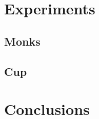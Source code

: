\section{Experiments}
\label{sec:experiment}

\subsection{Monks}
\label{sec:monks}

\subsection{Cup}
\label{sec:cup}

\section{Conclusions}
\label{sec:conclusions}
 




